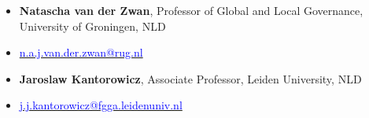 \begin{publications}

\begin{itemize}
\item[]{\small {\bfseries Natascha van der Zwan}, Professor of Global and Local Governance, University of Groningen, NLD}
\item[]{\vspace{-1mm}\textcolor{oxfordblue}{\faEnvelope} \hspace{0.1mm} {\small \href{mailto:n.a.j.van.der.zwan@rug.nl}{\textcolor{blue}{n.a.j.van.der.zwan@rug.nl}}}} \vspace{1.5mm}
\item[]{\small {\bfseries Jaroslaw Kantorowicz}, Associate Professor, Leiden University, NLD}
\item[]{\vspace{-1mm}\textcolor{oxfordblue}{\faEnvelope} \hspace{0.1mm} {\small \href{mailto:j.j.kantorowicz@fgga.leidenuniv.nl}{\textcolor{blue}{j.j.kantorowicz@fgga.leidenuniv.nl}}}} \vspace{1.5mm}
\end{itemize}

\end{publications}
